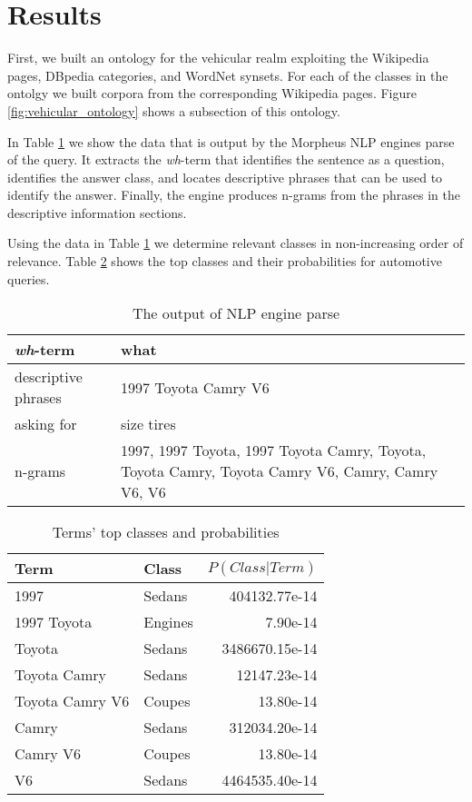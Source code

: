 \section{Results}
\label{sec:results}


First, we built an ontology for the vehicular realm exploiting the Wikipedia pages, DBpedia categories, and WordNet synsets. For each of the classes in the ontolgy we built corpora from the corresponding Wikipedia pages. Figure \ref{fig:vehicular_ontology} shows a subsection of this ontology.

In Table \ref{tbl:nlp_engine_parse} we show the data that is output by the Morpheus NLP engines parse of the query.  It extracts the \emph{wh}-term that identifies the sentence as a question, identifies the answer class, and locates descriptive phrases that can be used to identify the answer. Finally, the engine produces n-grams from the phrases in the descriptive information sections.

Using the data in Table \ref{tbl:nlp_engine_parse} we determine relevant classes in non-increasing order of relevance. Table \ref{tbl:term_classes} shows the top classes and their probabilities for automotive queries.

\begin{table}[!]\footnotesize
	\begin{tabular}{|l|p{4.9cm}|}
		\hline 
		\emph{wh}-term & what \\
		\hline 
		descriptive phrases & \small 1997 Toyota Camry V6 \\
		\hline 
		asking for & size tires \\
		\hline 
		n-grams & \small 1997, 1997 Toyota, 1997 Toyota Camry, Toyota, Toyota Camry, Toyota Camry V6, Camry, Camry V6, V6 \\
		\hline
	\end{tabular}
	\caption{The output of NLP engine parse}
	\label{tbl:nlp_engine_parse} 
\end{table}

\begin{table}[!]\footnotesize

\begin{tabular}{| p{3.5cm} | p{1.45cm} | r |}
\hline 
Term & Class & $P(Class|Term)$ \\ \hline
1997 & Sedans & 404132.77e-14\\ 
1997 Toyota & Engines & 7.90e-14\\ 
Toyota  & Sedans & 3486670.15e-14\\ 
Toyota Camry & Sedans & 12147.23e-14\\ 
Toyota Camry V6 & Coupes & 13.80e-14\\ 
Camry & Sedans & 312034.20e-14\\ 
Camry V6 & Coupes & 13.80e-14\\ 
V6 & Sedans & 4464535.40e-14\\ \hline
\end{tabular}        

\caption{Terms' top classes and probabilities}
\label{tbl:term_classes}   

\end{table}


